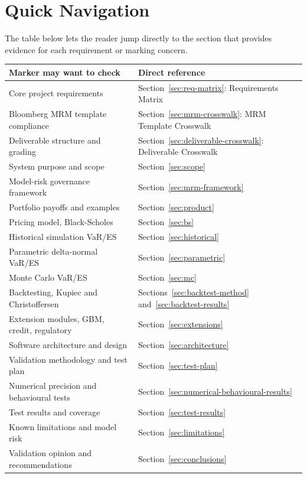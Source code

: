 \documentclass[11pt]{article}
\begin{document}
\tableofcontents
\newpage

\section{Quick Navigation}
\label{sec:navigation}

The table below lets the reader jump directly to the section that provides
evidence for each requirement or marking concern.

\begin{center}
\small
\begin{longtable}{L{5.5cm}L{7.5cm}}
\toprule
\textbf{Marker may want to check} & \textbf{Direct reference} \\
\midrule
Core project requirements & Section~\ref{sec:req-matrix}: Requirements Matrix \\
Bloomberg MRM template compliance & Section~\ref{sec:mrm-crosswalk}: MRM Template Crosswalk \\
Deliverable structure and grading & Section~\ref{sec:deliverable-crosswalk}: Deliverable Crosswalk \\
System purpose and scope & Section~\ref{sec:scope} \\
Model-risk governance framework & Section~\ref{sec:mrm-framework} \\
Portfolio payoffs and examples & Section~\ref{sec:product} \\
Pricing model, Black-Scholes & Section~\ref{sec:bs} \\
Historical simulation VaR/ES & Section~\ref{sec:historical} \\
Parametric delta-normal VaR/ES & Section~\ref{sec:parametric} \\
Monte Carlo VaR/ES & Section~\ref{sec:mc} \\
Backtesting, Kupiec and Christoffersen & Sections~\ref{sec:backtest-method} and~\ref{sec:backtest-results} \\
Extension modules, GBM, credit, regulatory & Section~\ref{sec:extensions} \\
Software architecture and design & Section~\ref{sec:architecture} \\
Validation methodology and test plan & Section~\ref{sec:test-plan} \\
Numerical precision and behavioural tests & Section~\ref{sec:numerical-behavioural-results} \\
Test results and coverage & Section~\ref{sec:test-results} \\
Known limitations and model risk & Section~\ref{sec:limitations} \\
Validation opinion and recommendations & Section~\ref{sec:conclusions} \\
\bottomrule
\end{longtable}
\end{center}
\end{document}
